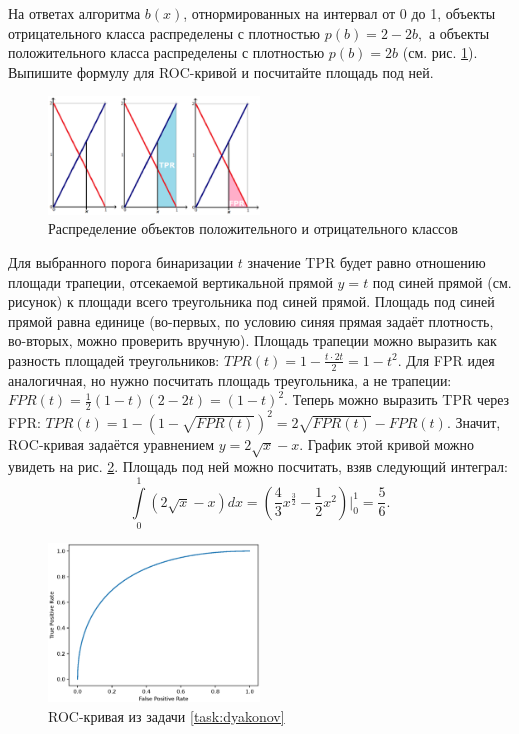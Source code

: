 \documentclass[12pt,a4paper]{article}
\begin{document}
\begin{vkProblem}\label{task:dyakonov}
На ответах алгоритма $b(x)$, отнормированных на интервал от 0 до 1, объекты отрицательного класса распределены с плотностью $p(b) = 2 - 2b,$ а объекты положительного класса распределены с плотностью $p(b) = 2b$ (см. рис. \ref{fig:densities}).
Выпишите формулу для ROC-кривой и посчитайте площадь под ней.
\end{vkProblem}

\begin{figure}[th!]
	\centering
	\includegraphics[width=0.5\textwidth]{./img/pic6.eps}
	\caption{Распределение объектов положительного и отрицательного классов}
 \label{fig:densities}
\end{figure}

\begin{esSolution}
Для выбранного порога бинаризации $t$ значение TPR будет равно отношению площади трапеции, отсекаемой вертикальной прямой $y = t$ под синей прямой (см. рисунок) к площади всего треугольника под синей прямой.
Площадь под синей прямой равна единице (во-первых, по условию синяя прямая задаёт плотность, во-вторых, можно проверить вручную).
Площадь трапеции можно выразить как разность площадей треугольников: $TPR(t) = 1 - \frac{t \cdot 2t}{2} = 1 - t^2.$
Для FPR идея аналогичная, но нужно посчитать площадь треугольника, а не трапеции: $FPR(t) = \frac{1}{2}(1 - t)(2 - 2t) = (1 - t)^2.$
Теперь можно выразить TPR через FPR:
$TPR(t) = 1 - (1 - \sqrt{FPR(t)})^2 = 2\sqrt{FPR(t)} - FPR(t).$
Значит, ROC-кривая задаётся уравнением $y = 2\sqrt{x} - x.$
График этой кривой можно увидеть на рис. \ref{fig:roc2}.
Площадь под ней можно посчитать, взяв следующий интеграл:
$$
\int\limits_0^1 (2\sqrt{x} - x)dx = \left(\frac{4}{3}x^{\frac{3}{2}} - \frac{1}{2}x^2\right)\bigg|_0^1 = \frac{5}{6}.
$$

\begin{figure}[th!]
	\centering
	\includegraphics[width=0.5\textwidth]{./img/roc2.eps}
	\caption{ROC-кривая из задачи \ref{task:dyakonov}}
 \label{fig:roc2}
\end{figure}

\end{esSolution}
\end{document}
